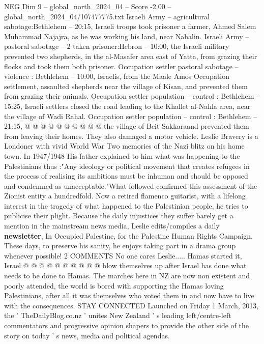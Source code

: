\begin{textsample}{NEG Dim 9 – global\_north\_2024\_04 – Score -2.00 – global\_north\_2024\_04/107477775.txt}
Israeli Army -- agricultural sabotage:Bethlehem -- 20:15, Israeli troops took prisoner a farmer, Ahmed Salem Muhammad Najajra, as he was working his land, near Nahalin.
Israeli Army -- pastoral sabotage -- 2 taken prisoner:Hebron -- 10:00, the Israeli military prevented two shepherds, in the al-Masafer area east of Yatta, from grazing their flocks and took them both prisoner.
Occupation settler pastoral sabotage -- violence : Bethlehem -- 10:00, Israelis, from the Maale Amos Occupation settlement, assaulted shepherds near the village of Kisan, and prevented them from grazing their animals.
Occupation settler population -- control : Bethlehem -- 15:25, Israeli settlers closed the road leading to the Khallet al-Nahla area, near the village of Wadi Rahal.
Occupation settler population -- control : Bethlehem -- 21:15, @ @ @ @ @ @ @ @ @ @ the village of Beit Sakkaraand prevented them from leaving their homes.
They also damaged a motor vehicle.
Leslie Bravery is a Londoner with vivid World War Two memories of the Nazi blitz on his home town.
In 1947/1948 His father explained to him what was happening to the Palestinians thus :"Any ideology or political movement that creates refugees in the process of realising its ambitions must be inhuman and should be opposed and condemned as unacceptable."What followed confirmed this assessment of the Zionist entity a hundredfold.
Now a retired flamenco guitarist, with a lifelong interest in the tragedy of what happened to the Palestinian people, he tries to publicise their plight.
Because the daily injustices they suffer barely get a mention in the mainstream news media, Leslie edits/compiles a daily \textbf{newsletter}, In Occupied Palestine, for the Palestine Human Rights Campaign.
These days, to preserve his sanity, he enjoys taking part in a drama group whenever possible! 2 COMMENTS No one cares Leslie.....
Hamas started it, Israel @ @ @ @ @ @ @ @ @ @ blow themselves up after Israel has done what needs to be done to Hamas.
The marches here in NZ are now non existent and poorly attended, the world is bored with supporting the Hamas loving Palestinians, after all it was themselves who voted them in and now have to live with the consequences.
STAY CONNECTED Launched on Friday 1 March, 2013, the ' TheDailyBlog.co.nz ' unites New Zealand ' s leading left/centre-left commentators and progressive opinion shapers to provide the other side of the story on today ' s news, media and political agendas.

\end{textsample}
